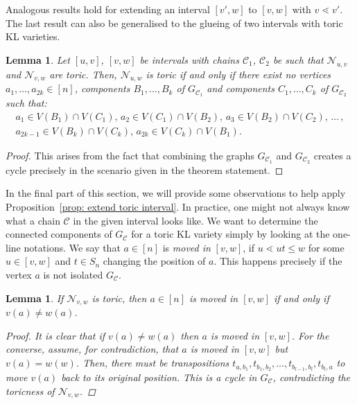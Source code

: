 \documentclass[11pt]{amsart}
\newtheorem{lemma}[theorem]{Lemma}
\theoremstyle{definition}
\theoremstyle{definition}
\theoremstyle{definition}
\theoremstyle{definition}
\newcommand{\Nvw}{\mathcal{N}_{v,w}}
\begin{document}
\noindent Analogous results hold for extending an interval $[v',w]$ to $[v,w]$ with $v \lessdot v'$. The last result can also be generalised to the glueing of two intervals with toric KL varieties.

\begin{lemma}\label{lem: gluing two intervals}
    Let $[u,v]$, $[v,w]$ be intervals with chains $\mathcal C_1$, $\mathcal C_2$ be such that $\mathcal N_{u,v}$ and $\mathcal N_{v,w}$ are toric. Then, $\mathcal N_{u,w}$ is toric if and only if there exist no vertices $a_1, \ldots,a_{2k} \in [n]$, components $B_1,\ldots, B_{k}$ of $G_{\mathcal C_1}$ and components $C_1,\ldots, C_{k}$ of $G_{\mathcal C_2}$ such that:
    \begin{align*}
    a_1 \in V(B_1) \cap V(C_1), \, 
      a_2 \in V(C_1) \cap V(B_2), \,
      a_3 \in V(B_2) \cap V(C_2), \, \ldots \, , \\
      a_{2k-1} \in V(B_{k}) \cap V(C_k), \, 
      a_{2k} \in V(C_k) \cap V(B_1).
     \end{align*}
     \end{lemma}
\begin{proof}
  This arises from the fact that combining the graphs $G_{\mathcal C_1}$ and $G_{\mathcal C_2}$ creates a cycle precisely in the scenario given in the theorem statement.
\end{proof}     

\noindent In the final part of this section, we will provide some observations to help apply Proposition~\ref{prop: extend toric interval}. 
In practice, one might not always know what a chain $\mathcal C$ in the given interval looks like. We want to determine the connected components of $G_{\mathcal C}$ for a toric KL variety simply by looking at the one-line notations. 
We say that $a \in [n]$ is \textit{moved in} $[v,w]$, if $u \lessdot u t \leq w$ for some $u \in [v,w]$ and $t \in S_n$ changing the position of $a$. This happens precisely if the vertex $a$ is not isolated $G_{\mathcal C}$.

\begin{lemma}\label{lem:toric move}
    If $\Nvw$ is toric, then $a\in [n]$ is moved in $[v,w]$ if and only if $v(a) \neq w(a)$.
    \begin{proof}
        It is clear that if $v(a) \neq w(a)$ then $a$ is moved in $[v,w]$. For the converse, assume, for contradiction, that $a$ is moved in $[v,w]$ but $v(a)=w(w)$. Then, there must be transpositions $t_{a,b_1},t_{b_1,b_2}, \ldots, t_{b_{l-1},b_l},t_{b_l,a}$ to move $v(a)$ back to its original position. This is a cycle in $G_{\mathcal C}$, contradicting the toricness of $\Nvw$.
    \end{proof}
\end{lemma}
\end{document}
